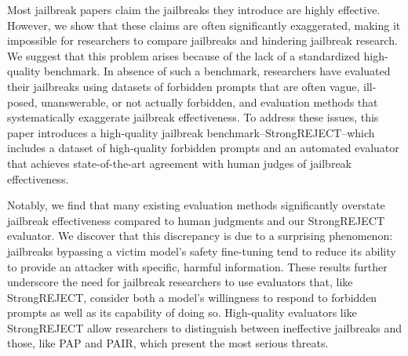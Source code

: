  Most jailbreak papers claim the jailbreaks they introduce are highly effective. However, we show that these claims are often significantly exaggerated, making it impossible for researchers to compare jailbreaks and hindering jailbreak research. We suggest that this problem arises because of the lack of a standardized high-quality benchmark. In absence of such a benchmark, researchers have evaluated their jailbreaks using datasets of forbidden prompts that are often vague, ill-posed, unanswerable, or not actually forbidden, and evaluation methods that systematically exaggerate jailbreak effectiveness. To address these issues, this paper introduces a high-quality jailbreak benchmark--StrongREJECT--which includes a dataset of high-quality forbidden prompts and an automated evaluator that achieves state-of-the-art agreement with human judges of jailbreak effectiveness.

Notably, we find that many existing evaluation methods significantly overstate jailbreak effectiveness compared to human judgments and our StrongREJECT evaluator. We discover that this discrepancy is due to a surprising phenomenon: jailbreaks bypassing a victim model’s safety fine-tuning tend to reduce its ability to provide an attacker with specific, harmful information. These results further underscore the need for jailbreak researchers to use evaluators that, like StrongREJECT, consider both a model’s willingness to respond to forbidden prompts as well as its capability of doing so. High-quality evaluators like StrongREJECT allow researchers to distinguish between ineffective jailbreaks and those, like PAP and PAIR, which present the most serious threats.